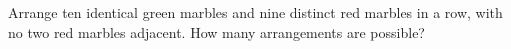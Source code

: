Arrange ten identical green marbles and nine distinct red marbles in a row, with no two red marbles adjacent. How many arrangements are possible?
